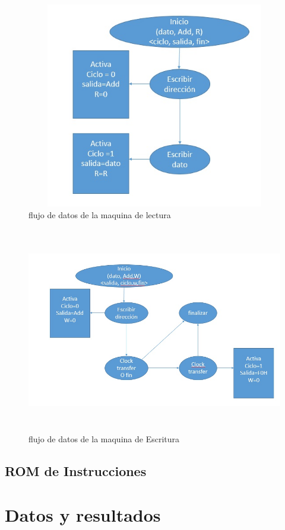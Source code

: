 \documentclass[12pt,a4paper]{article}
\begin{document}
\begin{figure}[htbp]
	\centering
	\includegraphics[height=9cm, width=16cm]{img/FlujoLec.jpg}
	\caption[3erNivel]{flujo de datos de la maquina de lectura}
	\label{fig:FML}
\end{figure}
\begin{figure}[htbp]
	\centering
	\includegraphics[height=9cm, width=16cm]{img/FlujoEsc.jpg}
	\caption[3erNivel]{flujo de datos de la maquina de Escritura}
	\label{fig:FME}
\end{figure}
\subsection{ROM de Instrucciones}


\section{Datos y resultados}
\end{document}
